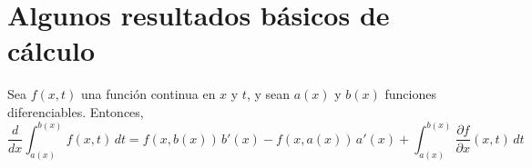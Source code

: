 \section{Algunos resultados básicos de cálculo}

\begin{theorem}\label{thm:leibniz}
    Sea $f(x, t)$ una función continua en $x$ y $t$, y sean $a(x)$ y $b(x)$ funciones diferenciables. Entonces,
    \begin{equation*}
        \frac{d}{dx} \int_{a(x)}^{b(x)} f(x, t)\,dt = f(x, b(x))\,b'(x) - f(x, a(x))\,a'(x) + \int_{a(x)}^{b(x)} \frac{\partial f}{\partial x}(x, t)\,dt
    \end{equation*}
\end{theorem}








